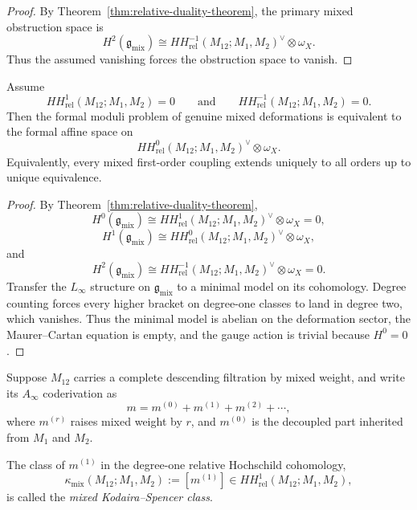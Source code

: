 \begin{proof}
By Theorem~\ref{thm:relative-duality-theorem}, the primary mixed obstruction space is
\[
H^2(\mathfrak g_{\mathrm{mix}})
\cong
HH^{-1}_{\mathrm{rel}}(M_{12};M_1,M_2)^\vee\otimes \omega_X.
\]
Thus the assumed vanishing forces the obstruction space to vanish.
\end{proof}

\begin{theorem}
\label{thm:relative-central-formality}
Assume
\[
HH^{1}_{\mathrm{rel}}(M_{12};M_1,M_2)=0
\qquad\text{and}\qquad
HH^{-1}_{\mathrm{rel}}(M_{12};M_1,M_2)=0.
\]
Then the formal moduli problem of genuine mixed deformations is equivalent to the formal affine space on
\[
HH^{0}_{\mathrm{rel}}(M_{12};M_1,M_2)^\vee\otimes \omega_X.
\]
Equivalently, every mixed first-order coupling extends uniquely to all orders up to unique equivalence.
\end{theorem}

\begin{proof}
By Theorem~\ref{thm:relative-duality-theorem},
\[
H^0(\mathfrak g_{\mathrm{mix}})
\cong HH^{1}_{\mathrm{rel}}(M_{12};M_1,M_2)^\vee\otimes \omega_X=0,
\]
\[
H^1(\mathfrak g_{\mathrm{mix}})
\cong HH^{0}_{\mathrm{rel}}(M_{12};M_1,M_2)^\vee\otimes \omega_X,
\]
and
\[
H^2(\mathfrak g_{\mathrm{mix}})
\cong HH^{-1}_{\mathrm{rel}}(M_{12};M_1,M_2)^\vee\otimes \omega_X=0.
\]
Transfer the $L_\infty$ structure on $\mathfrak g_{\mathrm{mix}}$ to a minimal model on its cohomology. Degree counting forces every higher bracket on degree-one classes to land in degree two, which vanishes. Thus the minimal model is abelian on the deformation sector, the Maurer--Cartan equation is empty, and the gauge action is trivial because $H^0=0$.
\end{proof}

\begin{definition}
\label{def:mixed-kodaira-spencer-class}
Suppose $M_{12}$ carries a complete descending filtration by mixed weight, and write its $A_\infty$ coderivation as
\[
m = m^{(0)} + m^{(1)} + m^{(2)} + \cdots,
\]
where $m^{(r)}$ raises mixed weight by $r$, and $m^{(0)}$ is the decoupled part inherited from $M_1$ and $M_2$.

The class of $m^{(1)}$ in the degree-one relative Hochschild cohomology,
\[
\kappa_{\mathrm{mix}}(M_{12};M_1,M_2)
:= [m^{(1)}]
\in HH^{1}_{\mathrm{rel}}(M_{12};M_1,M_2),
\]
is called the \emph{mixed Kodaira--Spencer class}.
\end{definition}

